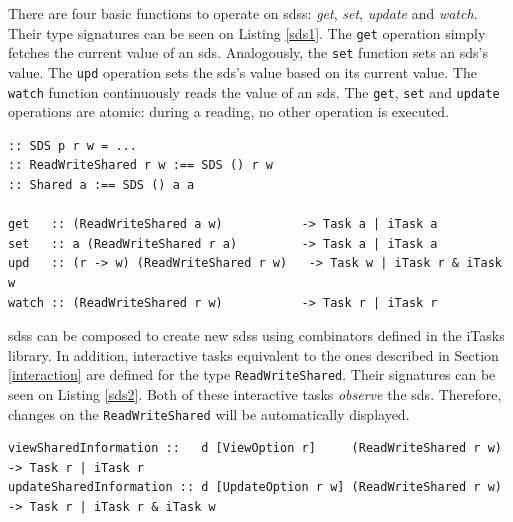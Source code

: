 There are four basic functions to operate on \acp{sds}: \textit{get}, \textit{set}, \textit{update} and \textit{watch}. Their type signatures can be seen on Listing \ref{sds1}. The \texttt{get} operation simply fetches the current value of an \ac{sds}. Analogously, the \texttt{set} function sets an \ac{sds}'s value. The \texttt{upd} operation sets the \ac{sds}'s value based on its current value. The \texttt{watch} function continuously reads the value of an \ac{sds}. The \texttt{get}, \texttt{set} and \texttt{update} operations are atomic: during a reading, no other operation is executed.

\begin{lstlisting}[caption=Shared Data Sources definitions,label=sds1,captionpos=b]
:: SDS p r w = ...
:: ReadWriteShared r w :== SDS () r w
:: Shared a :== SDS () a a

get   :: (ReadWriteShared a w)           -> Task a | iTask a
set   :: a (ReadWriteShared r a)         -> Task a | iTask a
upd   :: (r -> w) (ReadWriteShared r w)   -> Task w | iTask r & iTask w
watch :: (ReadWriteShared r w)           -> Task r | iTask r
\end{lstlisting}

\acp{sds} can be composed to create new \acp{sds} using combinators defined in the \gls{iTasks} library. In addition, interactive tasks equivalent to the ones described in Section \ref{interaction} are defined for the type \texttt{ReadWriteShared}. Their signatures can be seen on Listing \ref{sds2}. Both of these interactive tasks \textit{observe} the \ac{sds}. Therefore, changes on the \texttt{ReadWriteShared} will be automatically displayed.

\begin{lstlisting}[caption=\ac{sds} interactive tasks,label=sds2,captionpos=b]
viewSharedInformation ::   d [ViewOption r]     (ReadWriteShared r w) -> Task r | iTask r 
updateSharedInformation :: d [UpdateOption r w] (ReadWriteShared r w) -> Task r | iTask r & iTask w
\end{lstlisting}
